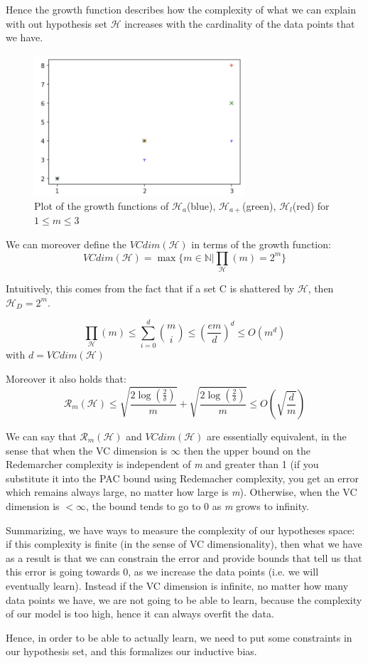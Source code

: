 Hence the growth function describes how the complexity of what we can explain with out hypothesis set $\mathcal{H}$ increases with the cardinality of the data points that we have.

\begin{figure}
    \centering
    \includegraphics[width=0.7\textwidth]{assets/fig13.png}
    \caption{Plot of the growth functions of $\mathcal{H}_a$(blue), $\mathcal{H}_{a+}$(green), $\mathcal{H}_l$(red) for $1 \leq m \leq 3$}
    \label{fig:fig13}
\end{figure}

We can moreover define the $VCdim(\mathcal{H})$ in terms of the growth function:
$$
VCdim(\mathcal{H}) = \max \{m \in \mathbb{N} | \prod_{\mathcal{H}}(m) = 2^m\}
$$

Intuitively, this comes from the fact that if a set C is shattered by $\mathcal{H}$, then $\mathcal{H}_D = 2^m$.

\begin{theorem}
    $$
    \prod_{\mathcal{H}}(m) \leq \sum_{i=0}^{d} \binom{m}{i} \leq \left(\dfrac{em}{d}\right)^d \leq O(m^d)
    $$
    with $d = VCdim(\mathcal{H})$
\end{theorem}

Moreover it also holds that:
$$
\mathcal{R}_m(\mathcal{H}) \leq \sqrt{\dfrac{2\log(\frac{2}{\delta})}{m}} + \sqrt{\dfrac{2\log(\frac{2}{\delta})}{m}} \leq O(\sqrt{\dfrac{d}{m}})
$$

We can say that $\mathcal{R}_m(\mathcal{H})$ and $VCdim(\mathcal{H})$ are essentially equivalent, in the sense that when the VC dimension is $\infty$ then the upper bound on the Redemarcher complexity is independent of \textit{m} and greater than 1 (if you substitute it into the PAC bound using Redemacher complexity, you get an error which remains always large, no matter how large is \textit{m}). Otherwise, when the VC dimension is $< \infty$, the bound tends to go to 0 as \textit{m} grows to infinity. 

Summarizing, we have ways to measure the complexity of our hypotheses
space: if this complexity is finite (in the sense of VC dimensionality), then
what we have as a result is that we can constrain the error and provide
bounds that tell us that this error is going towards 0, as we increase the
data points (i.e. we will eventually learn). Instead if the VC dimension is
infinite, no matter how many data points we have, we are not going to be
able to learn, because the complexity of our model is too high, hence it
can always overfit the data.

Hence, in order to be able to actually learn, we need to put some
constraints in our hypothesis set, and this formalizes our inductive
bias.
